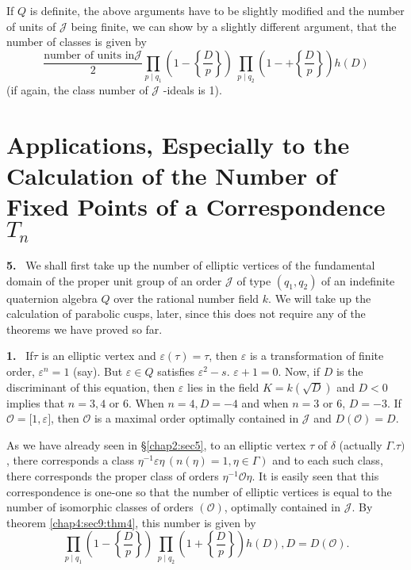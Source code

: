 \begin{note}
  If $Q$ is definite, the above arguments have to be slightly modified
  and the number of units of $ \mathcal{J} $ being finite, we can show
  by a slightly different argument, that the number of classes is given
  by 
$$
\dfrac{\text{number of units in}
      \mathcal{J}}{2}   \prod 
  \limits_{p \mid q_1}  \left( 1 - \left\{ \dfrac{D}{p} \right \} \right) ~ \prod
  \limits_{p \mid q_2}  \left( 1 -+ \left \{ \dfrac{D}{p}
  \right\}\right) h (D) 
$$ 
(if again, the class number of $ \mathcal{J} $ -ideals is 1). 
\end{note}

\section[Applications, Especially to the...]{Applications, Especially to the Calculation of the Number of
   Fixed Points of a Correspondence \texorpdfstring{$T_n $}{Tn}}\label{chap4:sec10}%


\noindent \textbf{5.}~
 We shall first take up the number of elliptic vertices of the
  fundamental domain of the proper unit group of an order $
  \mathcal{J}$ of type $(q_1, q_2)$ of an indefinite quaternion
  algebra $Q$  over the rational number field $k$. We will take up the
  calculation of parabolic cusps, later, since this does not require
  any of the theorems we have proved so far. 


\textbf{1.}~
If\pageoriginale $ \tau $ is an elliptic vertex and $ \varepsilon ( \tau ) =
  \tau $, then $ \varepsilon $ is a transformation of finite order, $
  \varepsilon^n = 1 $ (say). But $ \varepsilon \in Q $ satisfies  $
  \varepsilon^2 - s $. $ \varepsilon  + 1 = 0 $. Now, if $D$ is the
  discriminant of this equation, then $ \varepsilon $ lies in the
  field  $ K = k ( \sqrt{D})$  and  $ D < 0 $ implies that  $ n = 3,
  4$ or $6$. When $ n = 4, D = -4 $  and when $n =3$ or 6, $D=-3$.  If $
  \mathscr{O} = \big [ 1, \varepsilon \big ] $, then  $ \mathscr{O} $
  is a maximal order optimally contained in $\mathcal{J}$ and $D(
  \mathscr{O}) = D$. 

As we have already seen in  \S \ref{chap2:sec5}, to an elliptic vertex
$ \tau $ of 
$ \delta $ (actually $\Gamma. \tau ) $,  there corresponds a class $
\eta^{-1} \varepsilon \eta\, ( n ( \eta ) = 1, \eta \in \Gamma ) $ and
to each such class, there corresponds the proper class of orders $
\eta^{-1} \mathscr{O} \eta $. It is easily seen that this
correspondence is one-one so that the number of elliptic vertices is
equal to the number of isomorphic classes of orders $ ( \mathscr{O} )
$, optimally contained in $ \mathcal{J} $. By theorem \ref{chap4:sec9:thm4}, this number
is given by  
$$
 \prod_{p \mid q_1}  \left( 1 - \left\{ \frac{D}{p} \right\} \right) ~ \prod_{p
   \mid q_2}  \left( 1 + \left\{ \frac{D}{p} \right\} \right) h (D), D = D (
 \mathscr{O} ).  
$$

